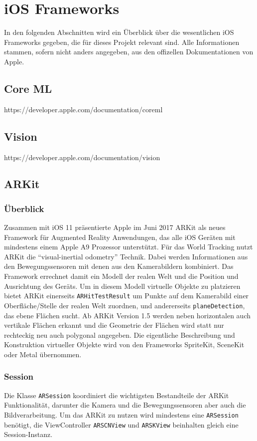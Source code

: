 \section{iOS Frameworks}
In den folgenden Abschnitten wird ein Überblick über die wesentlichen iOS Frameworks gegeben, die für dieses Projekt relevant sind. Alle Informationen stammen, sofern nicht anders angegeben, aus den offizellen Dokumentationen von Apple. %


\subsection{Core ML}
https://developer.apple.com/documentation/coreml


\subsection{Vision}
https://developer.apple.com/documentation/vision


\subsection{ARKit}

\subsubsection{Überblick}
Zusammen mit iOS 11 präsentierte Apple im Juni 2017 ARKit als neues Framework für Augmented Reality Anwendungen, das alle iOS Geräten mit mindestens einem Apple A9 Prozessor unterstützt. Für das World Tracking nutzt ARKit die "`visual-inertial odometry"' Technik. Dabei werden Informationen aus den Bewegungssensoren mit denen aus den Kamerabildern kombiniert. Das Framework errechnet damit ein Modell der realen Welt und die Position und Ausrichtung des Geräts. Um in diesem Modell virtuelle Objekte zu platzieren bietet ARKit einerseits \texttt{ARHitTestResult} um Punkte auf dem Kamerabild einer Oberfläche/Stelle der realen Welt zuordnen, und andererseits \texttt{planeDetection}, das ebene Flächen sucht. Ab ARKit Version 1.5 werden neben horizontalen auch vertikale Flächen erkannt und die Geometrie der Flächen wird statt nur rechteckig neu auch polygonal angegeben. Die eigentliche Beschreibung und Konstruktion virtueller Objekte wird von den Frameworks SpriteKit, SceneKit oder Metal übernommen.

\subsubsection{Session}
Die Klasse \texttt{ARSession} koordiniert die wichtigsten Bestandteile der ARKit Funktionalität, darunter die Kamera und die Bewegungssensoren aber auch die Bildverarbeitung. Um das ARKit zu nutzen wird mindestens eine \texttt{ARSession} benötigt, die ViewController \texttt{ARSCNView} und \texttt{ARSKView} beinhalten gleich eine Session-Instanz.

